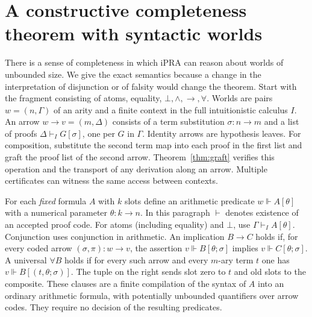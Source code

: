 \section{A constructive completeness theorem with syntactic worlds}\label{sec:canonical}
There is a sense of completeness in which iPRA can reason about worlds of unbounded size. We give the exact semantics because a change in the interpretation of disjunction or of falsity would change the theorem. Start with the fragment consisting of atoms, equality, $\bot,\wedge,\to,\forall$. Worlds are pairs $w=(n,\Gamma)$ of an arity and a finite context in the full intuitionistic calculus $I$. An arrow $w\to v=(m,\Delta)$ consists of a term substitution $\sigma:n\to m$ and a list of proofs $\Delta\vdash_I G[\sigma]$, one per $G$ in $\Gamma$. Identity arrows are hypothesis leaves. For composition, substitute the second term map into each proof in the first list and graft the proof list of the second arrow. Theorem~\ref{thm:graft} verifies this operation and the transport of any derivation along an arrow. Multiple certificates can witness the same access between contexts.

For each \emph{fixed} formula $A$ with $k$ slots define an arithmetic predicate $w\Vdash A[\theta]$ with a numerical parameter $\theta:k\to n$. In this paragraph $\vdash$ denotes existence of an accepted proof code. For atoms (including equality) and $\bot$, use $\Gamma\vdash_I A[\theta]$. Conjunction uses conjunction in arithmetic. An implication $B\to C$ holds if, for every coded arrow $(\sigma,\pi):w\to v$, the assertion $v\Vdash B[\theta;\sigma]$ implies $v\Vdash C[\theta;\sigma]$. A universal $\forall B$ holds if for every such arrow and every $m$-ary term $t$ one has $v\Vdash B[(t,\theta;\sigma)]$. The tuple on the right sends slot zero to $t$ and old slots to the composite. These clauses are a finite compilation of the syntax of $A$ into an ordinary arithmetic formula, with potentially unbounded quantifiers over arrow codes. They require no decision of the resulting predicates.

